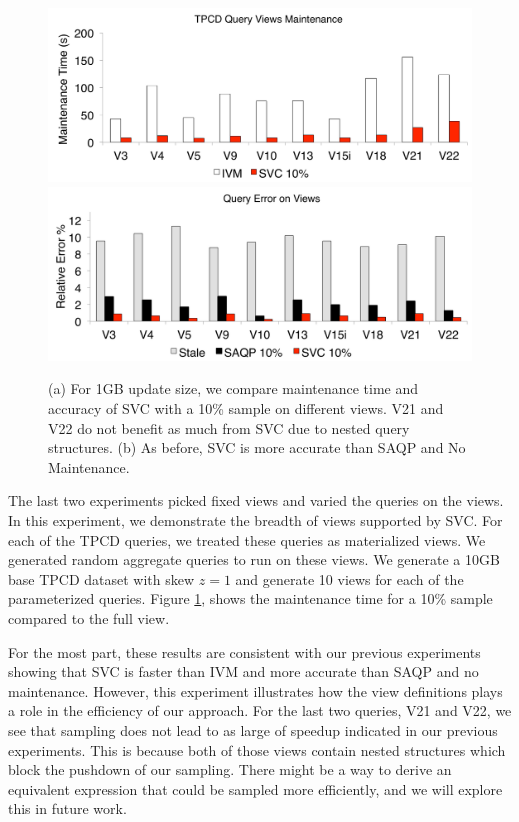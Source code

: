 \begin{figure}[t]
\centering
 \includegraphics[scale=0.16]{exp/msqv_1.pdf}
 \includegraphics[scale=0.16]{exp/msqv_2.pdf}

 \caption{(a) For 1GB update size, we compare maintenance time and accuracy of SVC with a 10\% sample on different views. V21 and V22 do not benefit as much from SVC due to nested query structures. (b) As before, SVC is more accurate than SAQP and No Maintenance. \label{exp3-acc}}
\end{figure}

The last two experiments picked fixed views and varied the queries on the views.
In this experiment, we demonstrate the breadth of views supported by SVC.
For each of the TPCD queries, we treated these queries as materialized views.
We generated random aggregate queries to run on these views.
We generate a 10GB base TPCD dataset with skew $z=1$ and generate 10 views for
each of the parameterized queries.
Figure \ref{exp3-acc}, shows the maintenance time for a 10\% sample compared to the full view.

For the most part, these results are consistent with our previous experiments showing that SVC is faster than IVM and more accurate than SAQP and no maintenance.
However, this experiment illustrates how the view definitions plays a role in the efficiency of our approach.
For the last two queries, V21 and V22, we see that sampling does not lead to as large of speedup indicated in our previous experiments.
This is because both of those views contain nested structures which block the pushdown of our sampling.
There might be a way to derive an equivalent expression that could be sampled more efficiently, and we will explore this in future work.

